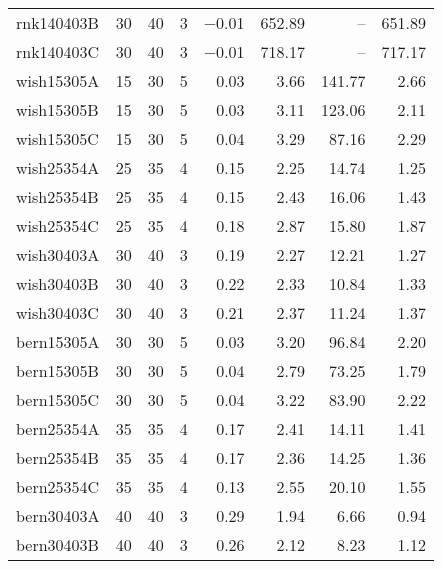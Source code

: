\begin{scriptsize}
\begin{xtabular*}{\linewidth}{@{\extracolsep{\fill}}lrrrrrrr@{}}
rnk140403B & \num{30} & \num{40} & \num{3} & \num{-0.01} & \num{652.89} & -- & \num{651.89} \\ 
rnk140403C & \num{30} & \num{40} & \num{3} & \num{-0.01} & \num{718.17} & -- & \num{717.17} \\ 
wish15305A & \num{15} & \num{30} & \num{5} & \num{0.03} & \num{3.66} & \num{141.77} & \num{2.66} \\ 
wish15305B & \num{15} & \num{30} & \num{5} & \num{0.03} & \num{3.11} & \num{123.06} & \num{2.11} \\ 
wish15305C & \num{15} & \num{30} & \num{5} & \num{0.04} & \num{3.29} & \num{87.16} & \num{2.29} \\ 
wish25354A & \num{25} & \num{35} & \num{4} & \num{0.15} & \num{2.25} & \num{14.74} & \num{1.25} \\ 
wish25354B & \num{25} & \num{35} & \num{4} & \num{0.15} & \num{2.43} & \num{16.06} & \num{1.43} \\ 
wish25354C & \num{25} & \num{35} & \num{4} & \num{0.18} & \num{2.87} & \num{15.80} & \num{1.87} \\ 
wish30403A & \num{30} & \num{40} & \num{3} & \num{0.19} & \num{2.27} & \num{12.21} & \num{1.27} \\ 
wish30403B & \num{30} & \num{40} & \num{3} & \num{0.22} & \num{2.33} & \num{10.84} & \num{1.33} \\ 
wish30403C & \num{30} & \num{40} & \num{3} & \num{0.21} & \num{2.37} & \num{11.24} & \num{1.37} \\ 
bern15305A & \num{30} & \num{30} & \num{5} & \num{0.03} & \num{3.20} & \num{96.84} & \num{2.20} \\ 
bern15305B & \num{30} & \num{30} & \num{5} & \num{0.04} & \num{2.79} & \num{73.25} & \num{1.79} \\ 
bern15305C & \num{30} & \num{30} & \num{5} & \num{0.04} & \num{3.22} & \num{83.90} & \num{2.22} \\ 
bern25354A & \num{35} & \num{35} & \num{4} & \num{0.17} & \num{2.41} & \num{14.11} & \num{1.41} \\ 
bern25354B & \num{35} & \num{35} & \num{4} & \num{0.17} & \num{2.36} & \num{14.25} & \num{1.36} \\ 
bern25354C & \num{35} & \num{35} & \num{4} & \num{0.13} & \num{2.55} & \num{20.10} & \num{1.55} \\ 
bern30403A & \num{40} & \num{40} & \num{3} & \num{0.29} & \num{1.94} & \num{6.66} & \num{0.94} \\ 
bern30403B & \num{40} & \num{40} & \num{3} & \num{0.26} & \num{2.12} & \num{8.23} & \num{1.12} \\ 

\end{xtabular*}
\end{scriptsize}
